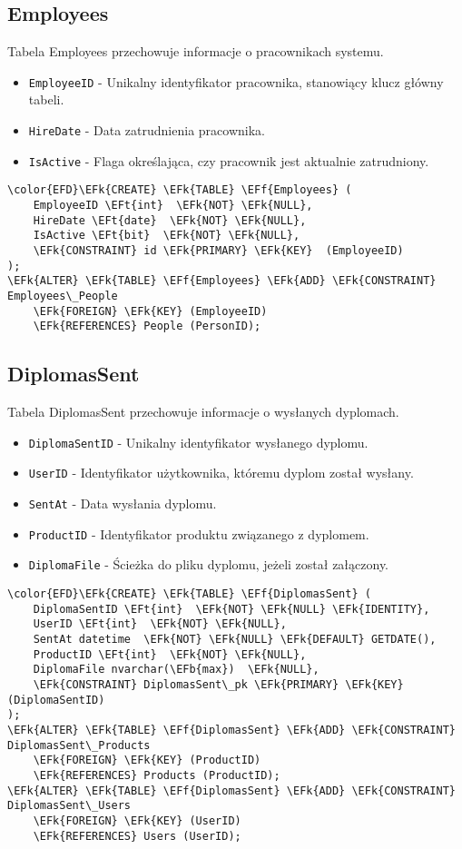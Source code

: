 \documentclass[11pt]{article}
\newcommand{\EFk}[1]{\textcolor{EFk}{\textbf{#1}}} %
\newcommand{\EFb}[1]{\textcolor{EFb}{\textbf{#1}}} %
\newcommand{\EFf}[1]{\textcolor{EFf}{#1}} %
\newcommand{\EFt}[1]{\textcolor{EFt}{\textbf{#1}}} %
\begin{document}
\subsection{Employees}
\label{sec:org6a20298}
Tabela Employees przechowuje informacje o pracownikach systemu.
\begin{itemize}
\item \texttt{EmployeeID} - Unikalny identyfikator pracownika, stanowiący klucz główny tabeli.
\item \texttt{HireDate} - Data zatrudnienia pracownika.
\item \texttt{IsActive} - Flaga określająca, czy pracownik jest aktualnie zatrudniony.
\end{itemize}
\begin{Code}
\begin{Verbatim}
\color{EFD}\EFk{CREATE} \EFk{TABLE} \EFf{Employees} (
    EmployeeID \EFt{int}  \EFk{NOT} \EFk{NULL},
    HireDate \EFt{date}  \EFk{NOT} \EFk{NULL},
    IsActive \EFt{bit}  \EFk{NOT} \EFk{NULL},
    \EFk{CONSTRAINT} id \EFk{PRIMARY} \EFk{KEY}  (EmployeeID)
);
\EFk{ALTER} \EFk{TABLE} \EFf{Employees} \EFk{ADD} \EFk{CONSTRAINT} Employees\_People
    \EFk{FOREIGN} \EFk{KEY} (EmployeeID)
    \EFk{REFERENCES} People (PersonID);
\end{Verbatim}
\end{Code}
\subsection{DiplomasSent}
\label{sec:orgbd87055}
Tabela DiplomasSent przechowuje informacje o wysłanych dyplomach.
\begin{itemize}
\item \texttt{DiplomaSentID} - Unikalny identyfikator wysłanego dyplomu.
\item \texttt{UserID} - Identyfikator użytkownika, któremu dyplom został wysłany.
\item \texttt{SentAt} - Data wysłania dyplomu.
\item \texttt{ProductID} - Identyfikator produktu związanego z dyplomem.
\item \texttt{DiplomaFile} - Ścieżka do pliku dyplomu, jeżeli został załączony.
\end{itemize}
\begin{Code}
\begin{Verbatim}
\color{EFD}\EFk{CREATE} \EFk{TABLE} \EFf{DiplomasSent} (
    DiplomaSentID \EFt{int}  \EFk{NOT} \EFk{NULL} \EFk{IDENTITY},
    UserID \EFt{int}  \EFk{NOT} \EFk{NULL},
    SentAt datetime  \EFk{NOT} \EFk{NULL} \EFk{DEFAULT} GETDATE(),
    ProductID \EFt{int}  \EFk{NOT} \EFk{NULL},
    DiplomaFile nvarchar(\EFb{max})  \EFk{NULL},
    \EFk{CONSTRAINT} DiplomasSent\_pk \EFk{PRIMARY} \EFk{KEY}  (DiplomaSentID)
);
\EFk{ALTER} \EFk{TABLE} \EFf{DiplomasSent} \EFk{ADD} \EFk{CONSTRAINT} DiplomasSent\_Products
    \EFk{FOREIGN} \EFk{KEY} (ProductID)
    \EFk{REFERENCES} Products (ProductID);
\EFk{ALTER} \EFk{TABLE} \EFf{DiplomasSent} \EFk{ADD} \EFk{CONSTRAINT} DiplomasSent\_Users
    \EFk{FOREIGN} \EFk{KEY} (UserID)
    \EFk{REFERENCES} Users (UserID);
\end{Verbatim}
\end{Code}
\end{document}
